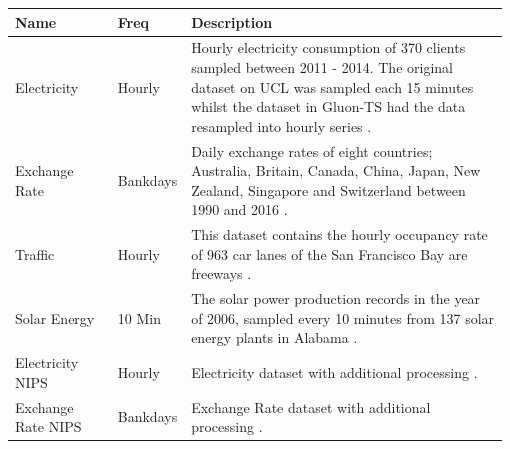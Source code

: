 \begin{table}[h]
  \centering
  \begin{tabular}{p{0.21\linewidth} | p{0.11\linewidth} | p{0.66\linewidth}}
    Name               & Freq      & Description                                                                                                                                                                                                                                                        \\ \hline
    Electricity        & Hourly    & Hourly electricity consumption of 370 clients sampled between 2011 - 2014. The original dataset on UCL was sampled each 15 minutes whilst the dataset in Gluon-TS had the data resampled into hourly series \cite{gluonts-website, salinas_high-dimensional_2019}. \\
    \hline
    Exchange Rate      & Bankdays  & Daily exchange rates of eight countries; Australia, Britain, Canada, China, Japan, New Zealand, Singapore and Switzerland between 1990 and 2016  \cite{lai_modeling_2018}.                                                                                         \\
    \hline
    Traffic            & Hourly    & This dataset contains the hourly occupancy rate of 963 car lanes of the San Francisco Bay are freeways \cite{gluonts-github}.                                                                                                                                      \\
    \hline
    Solar Energy       & 10 Min    & The solar power production records in the year of 2006, sampled every 10 minutes from 137 solar energy plants in Alabama \cite{lai_modeling_2018}.                                                                                                                 \\
    \hline
    Electricity NIPS   & Hourly    & Electricity dataset with additional processing \cite{salinas_high-dimensional_2019}.                                                                                                                                                                               \\
    \hline
    Exchange Rate NIPS & Bankdays  & Exchange Rate dataset with additional processing \cite{salinas_high-dimensional_2019}.                                                                                                                                                                             \\

\end{tabular}
\end{table}
